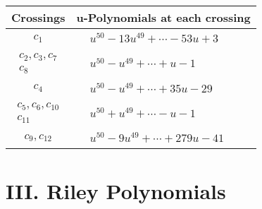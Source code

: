 \documentclass[1p]{elsarticle_modified}
\theoremstyle{definition}
\begin{document}
\begin{tabular}{m{50pt}|m{274pt}}
Crossings & \hspace{64pt}u-Polynomials at each crossing \\
\hline $$\begin{aligned}c_{1}\end{aligned}$$&$\begin{aligned}
&u^{50}-13 u^{49}+\cdots-53 u+3
\end{aligned}$\\
\hline $$\begin{aligned}c_{2},c_{3},c_{7}\\c_{8}\end{aligned}$$&$\begin{aligned}
&u^{50}- u^{49}+\cdots+u-1
\end{aligned}$\\
\hline $$\begin{aligned}c_{4}\end{aligned}$$&$\begin{aligned}
&u^{50}- u^{49}+\cdots+35 u-29
\end{aligned}$\\
\hline $$\begin{aligned}c_{5},c_{6},c_{10}\\c_{11}\end{aligned}$$&$\begin{aligned}
&u^{50}+u^{49}+\cdots- u-1
\end{aligned}$\\
\hline $$\begin{aligned}c_{9},c_{12}\end{aligned}$$&$\begin{aligned}
&u^{50}-9 u^{49}+\cdots+279 u-41
\end{aligned}$\\
\hline
\end{tabular}\newpage\renewcommand{\arraystretch}{1}
\centering \section*{ III. Riley Polynomials}
\end{document}
